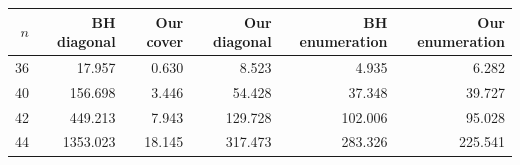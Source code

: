 \begin{tabular}{rrrrrr}
\toprule
$n$ & BH diagonal & Our cover & Our diagonal & BH enumeration & Our enumeration\\
\midrule
36 & 17.957 & 0.630 & 8.523 & 4.935 & 6.282\\
40 & 156.698 & 3.446 & 54.428 & 37.348 & 39.727\\
42 & 449.213 & 7.943 & 129.728 & 102.006 & 95.028\\
44 & 1353.023 & 18.145 & 317.473 & 283.326 & 225.541\\
\bottomrule
\end{tabular}
